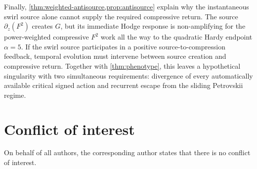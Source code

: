 \documentclass[11pt]{article}
\numberwithin{equation}{section}
\theoremstyle{definition}
\begin{document}
Finally, \cref{thm:weighted-antisource,prop:antisource} explain why the instantaneous swirl source alone cannot supply the required compressive return.  The source $\partial_z(F^2)$ creates $G$, but its immediate Hodge response is non-amplifying for the power-weighted compressive $F^2$ work all the way to the quadratic Hardy endpoint $\alpha=5$.  If the swirl source participates in a positive source-to-compression feedback, temporal evolution must intervene between source creation and compressive return.  Together with \cref{thm:phenotype}, this leaves a hypothetical singularity with two simultaneous requirements: divergence of every automatically available critical signed action and recurrent escape from the sliding Petrovskii regime.

\section*{Conflict of interest}
On behalf of all authors, the corresponding author states that there is no conflict of interest.
\end{document}
